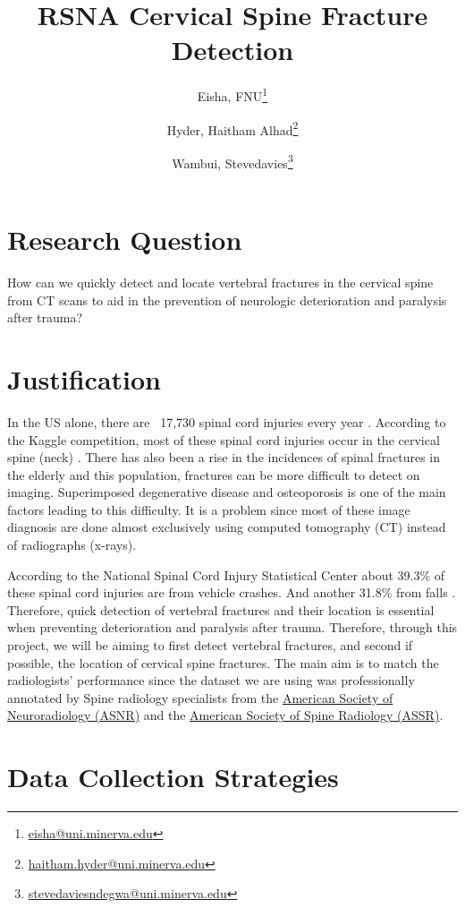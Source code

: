 \documentclass[11pt]{article}
\title{RSNA Cervical Spine Fracture Detection}
\author[1]{Eisha, FNU\thanks{\href{mailto:eisha@uni.minerva.edu}{eisha@uni.minerva.edu}}}
\author[1]{Hyder, Haitham Alhad\thanks{\href{mailto:haitham.hyder@uni.minerva.edu}{haitham.hyder@uni.minerva.edu} }}
\author[1]{Wambui, Stevedavies\thanks{\href{mailto:stevedaviesndegwa@uni.minerva.edu}{stevedaviesndegwa@uni.minerva.edu}}}
\affil[1]{
      \textbf{Haadavand's Minions}  \\
      \texttt{
        \href{mailto:hadavands-minions@uni.minerva.edu}
        {hadavands-minions@uni.minerva.edu}
      }
    }
\date{\vspace{-5ex}}
\begin{document}
\maketitle

\section*{Research Question}\label{research-question}

How can we quickly detect and locate vertebral fractures in the 
cervical spine from CT scans to aid in the prevention of 
neurologic deterioration and paralysis after trauma?

\section*{Justification}\label{justification}

In the US alone, there are ~17,730 spinal cord injuries every year \parencite{Morano2021-ak}.
According to the Kaggle competition, most of these spinal cord injuries occur
in the cervical spine (neck) \parencite{kaggle}.
There has also been a rise in the incidences of spinal fractures in the elderly
and this population, fractures can be more difficult to detect on imaging.
Superimposed degenerative disease and osteoporosis is one of the main factors
leading to this difficulty. It is a problem since most of these image
diagnosis are done almost exclusively using computed tomography (CT) \parencite{munera2012}
instead of radiographs (x-rays).

According to the National Spinal Cord Injury Statistical Center
about 39.3\% of these spinal cord injuries are from vehicle crashes.
And another 31.8\% from falls \parencite{NSCISC2019}.
Therefore, quick detection of vertebral fractures and their location is essential
when preventing deterioration and paralysis after trauma. Therefore, through
this project, we will be aiming to first detect vertebral fractures, and second
if possible, the location of cervical spine fractures. The main aim is
to match the radiologists' performance since the dataset we are using was professionally
annotated by Spine radiology specialists from the 
\href{https://www.asnr.org/}{American Society of Neuroradiology (ASNR)}
and the \href{https://www.theassr.org/}{American Society of Spine Radiology (ASSR)}.

\section*{Data Collection Strategies}\label{data-collection-strategies}
\end{document}
